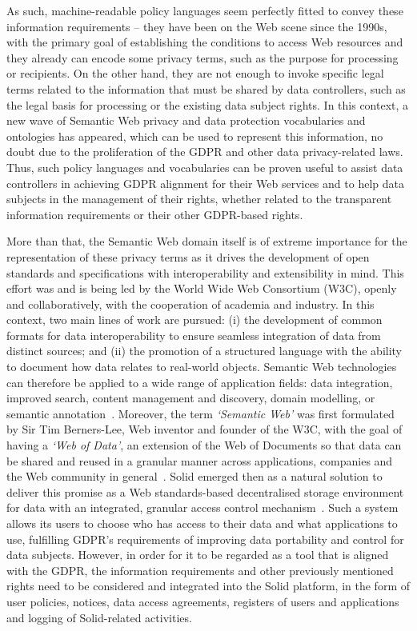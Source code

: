 As such, machine-readable policy languages seem perfectly fitted to convey these information requirements -- they have been on the Web scene since the 1990s, with the primary goal of establishing the conditions to access Web resources and they already can encode some privacy terms, such as the purpose for processing or recipients.
On the other hand, they are not enough to invoke specific legal terms related to the information that must be shared by data controllers, such as the legal basis for processing or the existing data subject rights.
In this context, a new wave of Semantic Web privacy and data protection vocabularies and ontologies has appeared, which can be used to represent this information, no doubt due to the proliferation of the GDPR and other data privacy-related laws.
Thus, such policy languages and vocabularies can be proven useful to assist data controllers in achieving GDPR alignment for their Web services and to help data subjects in the management of their rights, whether related to the transparent information requirements or their other GDPR-based rights.

More than that, the Semantic Web domain itself is of extreme importance for the representation of these privacy terms as it drives the development of open standards and specifications with interoperability and extensibility in mind.
This effort was and is being led by the World Wide Web Consortium (W3C), openly and collaboratively, with the cooperation of academia and industry.
In this context, two main lines of work are pursued: (i) the development of common formats for data interoperability to ensure seamless integration of data from distinct sources; and (ii) the promotion of a structured language with the ability to document how data relates to real-world objects.
Semantic Web technologies can therefore be applied to a wide range of application fields: data integration, improved search, content management and discovery, domain modelling, or semantic annotation~\citeyearpar{noauthor_semantic_2012}.
Moreover, the term \textit{`Semantic Web'} was first formulated by Sir Tim Berners-Lee, Web inventor and founder of the W3C, with the goal of having a \textit{`Web of Data'}, an extension of the Web of Documents so that data can be shared and reused in a granular manner across applications, companies and the Web community in general~\citep{berners-lee_semantic_2001}.
Solid emerged then as a natural solution to deliver this promise as a Web standards-based decentralised storage environment for data with an integrated, granular access control mechanism~\citep{sambra_solid_2016}.
Such a system allows its users to choose who has access to their data and what applications to use, fulfilling GDPR's requirements of improving data portability and control for data subjects.
However, in order for it to be regarded as a tool that is aligned with the GDPR, the information requirements and other previously mentioned rights need to be considered and integrated into the Solid platform, in the form of user policies, notices, data access agreements, registers of users and applications and logging of Solid-related activities.